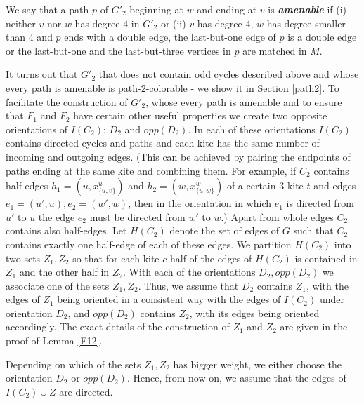 \documentclass[a4, 11pt]{article}
\newcommand{\<}{\langle}
\renewcommand{\>}{\rangle}
\begin{document}
We say that a path $p$ of $G'_2$ beginning at $w$ and ending at  $v$  is {\bf \em amenable} if (i) neither $v$ nor $w$ has degree $4$ in $G'_2$
or (ii) $v$ has degree $4$, $w$ has degree smaller than $4$ and $p$ ends with a double edge, the last-but-one edge of $p$ is a double edge or the last-but-one and the last-but-three vertices in $p$ are matched in $M$.

It turns out that $G'_2$ that does not contain odd cycles described above and whose every path is amenable is path-$2$-colorable - we show it in
 Section \ref{path2}. To facilitate the construction of $G'_2$, whose every path is amenable and to ensure that $F_1$ and $F_2$ have certain other useful properties we create  two opposite orientations of $I(C_2)$: $D_2$ and $opp(D_2)$. In each of these orientations $I(C_2)$ contains directed cycles and paths and each kite has the same number of incoming and outgoing edges. (This can be achieved by pairing the endpoints of paths ending at the same kite and combining them. For example, if  $C_2$ contains half-edges $h_1=(u, x^u_{\{u,v\}})$ and $h_2=(w, x^w_{\{u,w\}})$ of a certain $3$-kite $t$ and edges $e_1=(u',u), e_2=(w',w)$, then in the orientation  in which $e_1$ is directed from $u'$  to $u$ the edge $e_2$ must be directed from $w'$ to $w$.)  Apart from whole edges $C_2$ contains also half-edges. Let $H(C_2)$ denote the set of edges of $G$ such that $C_2$ contains exactly
one half-edge of each of these edges. We partition $H(C_2)$ into two sets $Z_1, Z_2$ so that for each kite $c$ half of the edges of $H(C_2)$
is contained in $Z_1$ and the other half in $Z_2$.
With each of the orientations $D_2, opp(D_2)$ we associate
one of the sets $Z_1, Z_2$. Thus,  we assume that $D_2$ contains $Z_1$, with the edges of $Z_1$ being oriented in a consistent way with the edges of $I(C_2)$ under orientation $D_2$, and $opp(D_2)$ contains $Z_2$,  with its edges being oriented accordingly.
The exact details of the construction of $Z_1$ and $Z_2$ are given in the proof of Lemma \ref{F12}.



Depending on which of the sets $Z_1, Z_2$ has bigger weight,  we either choose the orientation $D_2$ or $opp(D_2)$.  Hence, from now on, we assume that the edges of $I(C_2) \cup Z$ are directed.
\end{document}

